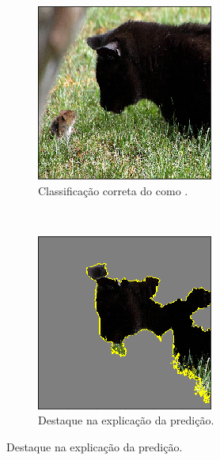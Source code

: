 \begin{figure}[H]
    \centering
    \caption{Exemplo de saída gerado pelo LIME em situação correta.}
    \label{project:fig:explain:lime2}
    \begin{subfigure}[t]{0.45\textwidth}
        \centering
        \includegraphics[width=1\linewidth]{recursos/imagens/project/gato.png}
        \caption{Classificação correta do  como .}
        \label{project:fig:explain:lime2.1}
    \end{subfigure}%
    ~
    \begin{subfigure}[t]{0.45\textwidth}
        \centering
        \includegraphics[width=1\linewidth]{recursos/imagens/project/mascara_gato.png}
        \caption{Destaque na explicação da predição.}
        \label{project:fig:explain:lime2.2}
    \end{subfigure}%


\end{figure}
